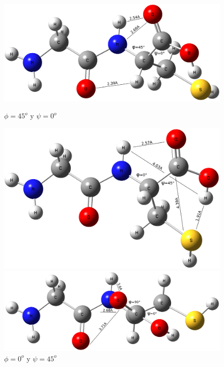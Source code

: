 \documentclass{article}
\begin{document}
    \begin{figure}[h!]
        \centering
        \begin{minipage}[b]{0.49\textwidth}
            \centering
          \includegraphics[scale=0.085]{GlyCys3D45fi.png}
          \caption{$\phi=45^o$ y $\psi=0^o$}
        \end{minipage}
        \hfill
        \begin{minipage}[b]{0.49\textwidth}
          \includegraphics[scale=0.085]{GlyCys3D45psi.png}
          \caption{$\phi=0^o$ y $\psi=45^o$}
        \end{minipage}
        \begin{minipage}[b]{0.49\textwidth}
            \centering
          \includegraphics[scale=0.085]{GlyCys3D90fi.png}

\end{minipage}
\end{figure}
\end{document}
